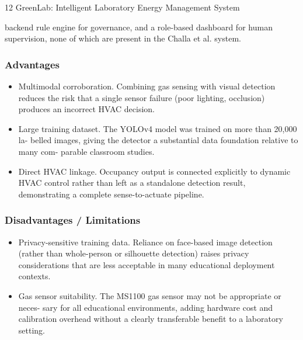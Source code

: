 12
GreenLab: Intelligent Laboratory Energy Management System


backend rule engine for governance, and a role-based dashboard for human supervision,
none of which are present in the Challa et al. system.



\subsubsection*{Advantages}



\begin{itemize}
  \item Multimodal corroboration. Combining gas sensing with visual detection reduces
the risk that a single sensor failure (poor lighting, occlusion) produces an incorrect
HVAC decision.
\end{itemize}

\begin{itemize}
  \item Large training dataset. The YOLOv4 model was trained on more than 20,000 la-
belled images, giving the detector a substantial data foundation relative to many com-
parable classroom studies.
\end{itemize}

\begin{itemize}
  \item Direct HVAC linkage. Occupancy output is connected explicitly to dynamic HVAC
control rather than left as a standalone detection result, demonstrating a complete
sense-to-actuate pipeline.
\end{itemize}



\subsubsection*{Disadvantages / Limitations}



\begin{itemize}
  \item Privacy-sensitive training data. Reliance on face-based image detection (rather
than whole-person or silhouette detection) raises privacy considerations that are less
acceptable in many educational deployment contexts.
\end{itemize}

\begin{itemize}
  \item Gas sensor suitability. The MS1100 gas sensor may not be appropriate or neces-
sary for all educational environments, adding hardware cost and calibration overhead
without a clearly transferable beneﬁt to a laboratory setting.
\end{itemize}

